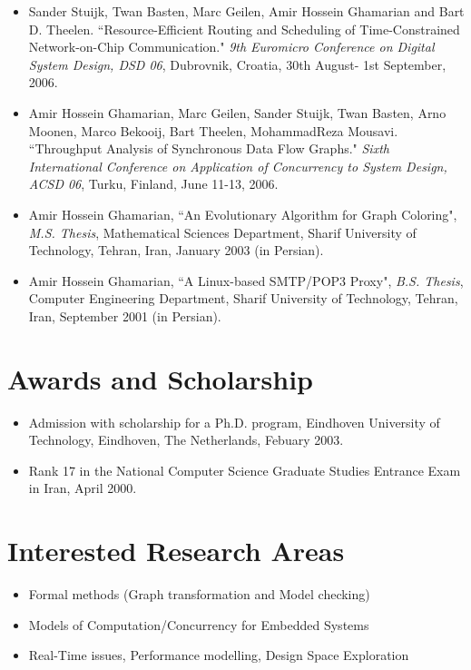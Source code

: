 \documentclass[a4paper]{article}
\begin{document}
\begin{itemize}
\item Sander Stuijk, Twan Basten, Marc Geilen, Amir Hossein Ghamarian and Bart D.
Theelen. ``Resource-Efficient Routing and Scheduling of
Time-Constrained Network-on-Chip Communication." \emph{9th Euromicro
Conference on Digital System Design, DSD 06}, Dubrovnik, Croatia,
30th August- 1st September, 2006.

\item Amir Hossein Ghamarian, Marc Geilen, Sander Stuijk, Twan Basten, Arno Moonen, Marco Bekooij, Bart Theelen, MohammadReza Mousavi.
``Throughput Analysis of Synchronous Data Flow Graphs." \emph{Sixth
International Conference on Application of Concurrency to System
Design, ACSD 06}, Turku, Finland, June 11-13, 2006.

\item Amir Hossein Ghamarian, ``An Evolutionary Algorithm for Graph
Coloring", \emph{M.S. Thesis}, Mathematical Sciences Department,
Sharif University of Technology, Tehran, Iran, January 2003 (in
Persian).

\item Amir Hossein Ghamarian, ``A Linux-based SMTP/POP3 Proxy", \emph{B.S.
Thesis}, Computer Engineering Department, Sharif University of
Technology, Tehran, Iran, September 2001 (in Persian).
\end{itemize}


\section{Awards and Scholarship}

\begin{itemize}

\item Admission with scholarship for a Ph.D. program,
Eindhoven University of Technology, Eindhoven, The Netherlands,
Febuary 2003.

\item Rank 17 in the National Computer Science Graduate Studies
Entrance Exam in Iran, April 2000.
\end{itemize}

\section{Interested Research Areas}
\begin{itemize}

\item Formal methods (Graph transformation and Model checking)

\item Models of Computation/Concurrency for Embedded Systems

\item Real-Time issues, Performance modelling, Design Space
Exploration

\end{itemize}
\end{document}

